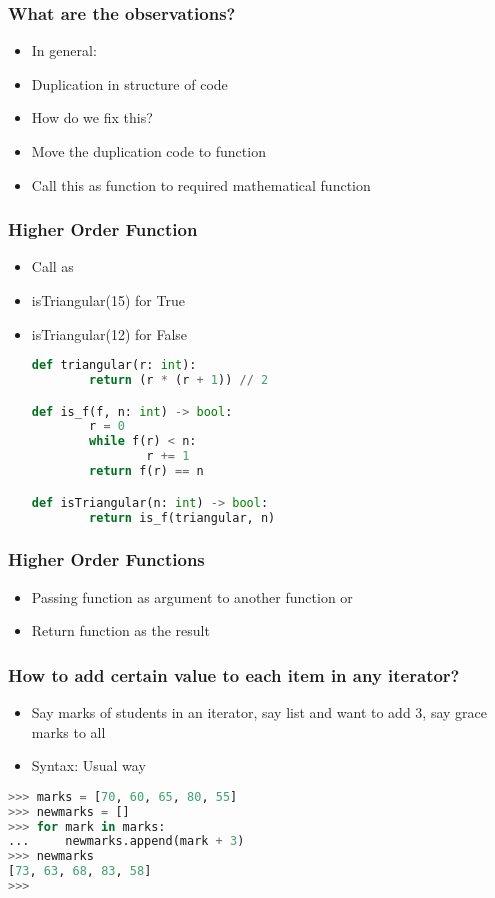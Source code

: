 \documentclass[14pt]{beamer}
\begin{document}
    \begin{frame}[containsverbatim]
        \frametitle{What are the observations?}
        \begin{itemize}
            \item \alert{In general:}
            \item Duplication in structure of code
            \item \alert{How do we fix this?}
            \item Move the duplication code to function
            \item Call this as function to required mathematical function      
        \end{itemize}
    \end{frame}
	
    \begin{frame}[containsverbatim]
        \frametitle{Higher Order Function}
        \begin{itemize}
            \item \alert{Call as}
            \item isTriangular(15) for True
            \item isTriangular(12) for False
        \begin{lstlisting}[language=Python]
def triangular(r: int):
        return (r * (r + 1)) // 2

def is_f(f, n: int) -> bool:
        r = 0
        while f(r) < n:
                r += 1
        return f(r) == n

def isTriangular(n: int) -> bool:
        return is_f(triangular, n)
        \end{lstlisting}
        \end{itemize}
    \end{frame}
    
    \begin{frame}[containsverbatim]
        \frametitle{Higher Order Functions}
        \begin{itemize}
            \item Passing function as argument to another function or
            \item Return function as the result
        \end{itemize}
	\end{frame}
	
    \begin{frame}[containsverbatim]
        \frametitle{How to add certain value to each item in any iterator?}
        \begin{itemize}
            \item Say marks of students in an iterator, say list and want to add 3, say grace marks to all
            \item \alert{Syntax: Usual way}
        \end{itemize}
        \begin{lstlisting}[language=Python]
>>> marks = [70, 60, 65, 80, 55]
>>> newmarks = []
>>> for mark in marks:
...     newmarks.append(mark + 3)
>>> newmarks
[73, 63, 68, 83, 58]
>>>
        \end{lstlisting}
    \end{frame}
\end{document}
